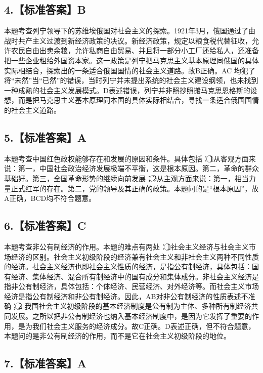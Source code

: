 \documentclass[UTF8,11pt]{ctexart}
\begin{document}
\subsection*{4.【标准答案】B}

本题考查列宁领导下的苏维埃俄国对社会主义的探索。1921年3月，俄国通过了由战时共产主义过渡到新经济政策的决议。新经济政策，规定以粮食税代替征收，允许农民自由出卖余粮，允许私商自由贸易、并且将一部分小工厂还给私人，还准备把一些企业租给外国资本家。这一政策是列宁把马克思主义基本原理同俄国的具体实际相结合，探索出的一条适合俄国国情的社会主义道路。故B正确。AC 均犯了将“未然”当“已然”的错误，当时列宁并未提出系统的社会主义建设纲领，也未找到一种成熟的社会主义发展模式。D表述错误，列宁并非照抄照搬马克思恩格斯的设想，而是把马克思主义基本原理同本国的具体实际相结合，寻找一条适合俄国国情的社会主义道路。


\subsection*{5.【标准答案】A}

本题考查中国红色政权能够存在和发展的原因和条件。具体包括：\textcircled{1}从客观方面来说：第一，中国社会政治经济发展极端不平衡，这是根本原因。第二，革命的群众基础好。第三，全国革命形势的继续向前发展；\textcircled{2}从主观方面来说：第一，相当力量正式红军的存在。第二，党的领导及其正确的政策。本题问的是“根本原因”，故 A正确，BCD均不符合题意。


\subsection*{6.【标准答案】C}

本题考查非公有制经济的作用。本题的难点有两处：\textcircled{1}社会主义经济与社会主义市场经济的区别。社会主义初级阶段的经济兼有社会主义和非社会主义两种不同性质的经济。社会主义经济也即社会主义性质的经济，是指公有制经济，具体包括：国有经济、集体经济、混合所有制经济中的国有成分和集体成分。非社会主义经济是指非公有制经济，具体包括：个体经济、民营经济、对外经济等。而社会主义市场经济是指公有制经济和非公有制经济。因此，AB对非公有制经济的性质表述不准确；\textcircled{2} 我国社会主义初级阶段的基本经济制度是公有制为主体、多种所有制经济共同发展。之所以把非公有制经济也纳入基本经济制度中，是因为它发挥了重要的作用，是为我们社会主义服务的经济成分。故C正确。D表述正确，但不符合题意，本题问的是非公有制经济的作用，而不是它在社会主义初级阶段的地位。


\subsection*{7.【标准答案】A}
\end{document}
